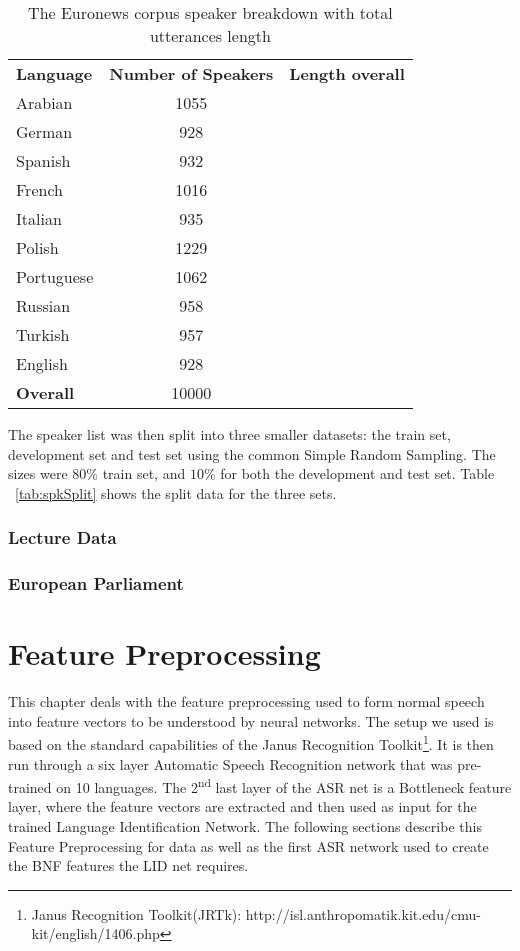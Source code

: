 \begin{table}[h]
\label{tab:spkData}
\centering
\begin{tabular}{| l | c | r | }
	\hline
	\textbf{Language} & \textbf{Number of Speakers} & \textbf{Length overall} \\
	Arabian & 1055 & \\
	German & 928 & \\
	Spanish & 932 & \\
	French & 1016 & \\
	Italian & 935 & \\
	Polish & 1229 & \\
	Portuguese & 1062 & \\
	Russian & 958 & \\
	Turkish & 957 & \\
	English & 928 & \\
	\hline
	\textbf{Overall} & 10000 & \\
	\hline
	
\end{tabular}
\caption{The Euronews corpus speaker breakdown with total utterances length}
\end{table}

The speaker list was then split into three smaller datasets: the train set, development set and test set using the common Simple Random Sampling. The sizes were \(80\%\) train set, and \(10\%\) for both the development and test set. Table ~\ref{tab:spkSplit} shows the split data for the three sets.


\subsection{Lecture Data}
\label{sec:LITasks:Lecture}

\subsection{European Parliament}
\label{sec:LITasks:EU}

\chapter{Feature Preprocessing}
\label{ch:FP}

This chapter deals with the feature preprocessing used to form normal speech into feature vectors to be understood by neural networks. The setup we used is based on the standard capabilities of the Janus Recognition Toolkit\footnote{Janus Recognition Toolkit(JRTk): http://isl.anthropomatik.kit.edu/cmu-kit/english/1406.php}. It is then run through a six layer Automatic Speech Recognition network that was pre-trained on 10 languages. The 2\textsuperscript{nd} last layer of the ASR net is a Bottleneck feature layer, where the feature vectors are extracted and then used as input for the trained Language Identification Network. The following sections describe this Feature Preprocessing for data as well as the first ASR network used to create the BNF features the LID net requires.

